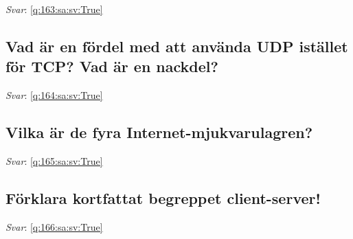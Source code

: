 \documentclass[a4paper,11pt,oneside]{article}
\begin{document}
\begin{sloppypar}
\label{q:163:sa:sv:False}

\vspace{2cm}

\noindent\makebox[\textwidth]{\hrulefill}

\vspace{1cm}

\textit{Svar}: \autoref{q:163:sa:sv:True}



\subsection{Vad \"ar en f\"ordel med att anv\"anda UDP ist\"allet f\"or TCP? Vad \"ar en nackdel?}

\label{q:164:sa:sv:False}

\vspace{2cm}

\noindent\makebox[\textwidth]{\hrulefill}

\vspace{1cm}

\textit{Svar}: \autoref{q:164:sa:sv:True}



\subsection{Vilka \"ar de fyra Internet-mjukvarulagren?}

\label{q:165:sa:sv:False}

\vspace{2cm}

\noindent\makebox[\textwidth]{\hrulefill}

\vspace{1cm}

\textit{Svar}: \autoref{q:165:sa:sv:True}



\subsection{F\"orklara kortfattat begreppet client-server!}

\label{q:166:sa:sv:False}

\vspace{2cm}

\noindent\makebox[\textwidth]{\hrulefill}

\vspace{1cm}

\textit{Svar}: \autoref{q:166:sa:sv:True}




\end{sloppypar}
\end{document}
